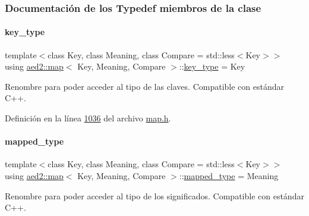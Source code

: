 \subsubsection{Documentación de los \textquotesingle{}Typedef\textquotesingle{} miembros de la clase}
\mbox{\label{classaed2_1_1map_a4273e8812e7105a618df58a2c8b72b7d_a4273e8812e7105a618df58a2c8b72b7d}} 
\paragraph{\texorpdfstring{key\+\_\+type}{key\_type}}
{\footnotesize\ttfamily template$<$class Key, class Meaning, class Compare = std\+::less$<$\+Key$>$$>$ \\
using \hyperlink{classaed2_1_1map}{aed2\+::map}$<$ Key, Meaning, Compare $>$\+::\hyperlink{classaed2_1_1map_a4273e8812e7105a618df58a2c8b72b7d_a4273e8812e7105a618df58a2c8b72b7d}{key\+\_\+type} =  Key}



Renombre para poder acceder al tipo de las claves. Compatible con estándar C++. 



Definición en la línea \hyperlink{map_8h_source_l01036}{1036} del archivo \hyperlink{map_8h_source}{map.\+h}.

\mbox{\label{classaed2_1_1map_aa3e34bf624f3009884a71b18f4ddae40_aa3e34bf624f3009884a71b18f4ddae40}} 
\paragraph{\texorpdfstring{mapped\+\_\+type}{mapped\_type}}
{\footnotesize\ttfamily template$<$class Key, class Meaning, class Compare = std\+::less$<$\+Key$>$$>$ \\
using \hyperlink{classaed2_1_1map}{aed2\+::map}$<$ Key, Meaning, Compare $>$\+::\hyperlink{classaed2_1_1map_aa3e34bf624f3009884a71b18f4ddae40_aa3e34bf624f3009884a71b18f4ddae40}{mapped\+\_\+type} =  Meaning}



Renombre para poder acceder al tipo de los significados. Compatible con estándar C++. 



